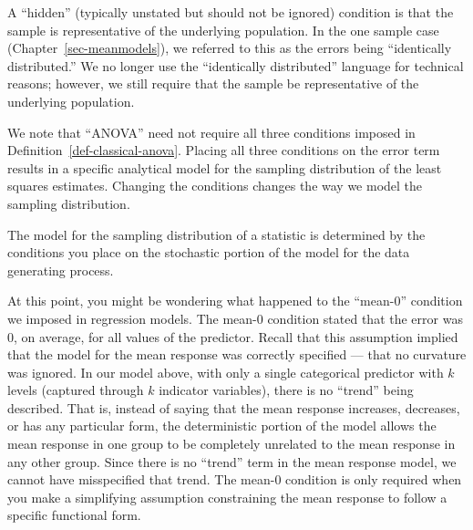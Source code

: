 \documentclass[
  letterpaper,
  DIV=11,
  numbers=noendperiod]{scrreprt}
\theoremstyle{definition}
\theoremstyle{definition}
\theoremstyle{plain}
\theoremstyle{remark}
\begin{document}
\begin{tcolorbox}[enhanced jigsaw, colbacktitle=quarto-callout-warning-color!10!white, colback=white, left=2mm, title=\textcolor{quarto-callout-warning-color}{\faExclamationTriangle}\hspace{0.5em}{Warning}, toptitle=1mm, leftrule=.75mm, breakable, bottomrule=.15mm, arc=.35mm, rightrule=.15mm, toprule=.15mm, coltitle=black, opacityback=0, colframe=quarto-callout-warning-color-frame, opacitybacktitle=0.6, bottomtitle=1mm, titlerule=0mm]

A ``hidden'' (typically unstated but should not be ignored) condition is
that the sample is representative of the underlying population. In the
one sample case (Chapter~\ref{sec-meanmodels}), we referred to this as
the errors being ``identically distributed.'' We no longer use the
``identically distributed'' language for technical reasons; however, we
still require that the sample be representative of the underlying
population.

\end{tcolorbox}

We note that ``ANOVA'' need not require all three conditions imposed in
Definition~\ref{def-classical-anova}. Placing all three conditions on
the error term results in a specific analytical model for the sampling
distribution of the least squares estimates. Changing the conditions
changes the way we model the sampling distribution.

\begin{tcolorbox}[enhanced jigsaw, colbacktitle=quarto-callout-tip-color!10!white, colback=white, left=2mm, title=\textcolor{quarto-callout-tip-color}{\faLightbulb}\hspace{0.5em}{Big Idea}, toptitle=1mm, leftrule=.75mm, breakable, bottomrule=.15mm, arc=.35mm, rightrule=.15mm, toprule=.15mm, coltitle=black, opacityback=0, colframe=quarto-callout-tip-color-frame, opacitybacktitle=0.6, bottomtitle=1mm, titlerule=0mm]

The model for the sampling distribution of a statistic is determined by
the conditions you place on the stochastic portion of the model for the
data generating process.

\end{tcolorbox}

At this point, you might be wondering what happened to the ``mean-0''
condition we imposed in regression models. The mean-0 condition stated
that the error was 0, on average, for all values of the predictor.
Recall that this assumption implied that the model for the mean response
was correctly specified --- that no curvature was ignored. In our model
above, with only a single categorical predictor with \(k\) levels
(captured through \(k\) indicator variables), there is no ``trend''
being described. That is, instead of saying that the mean response
increases, decreases, or has any particular form, the deterministic
portion of the model allows the mean response in one group to be
completely unrelated to the mean response in any other group. Since
there is no ``trend'' term in the mean response model, we cannot have
misspecified that trend. The mean-0 condition is only required when you
make a simplifying assumption constraining the mean response to follow a
specific functional form.
\end{document}
